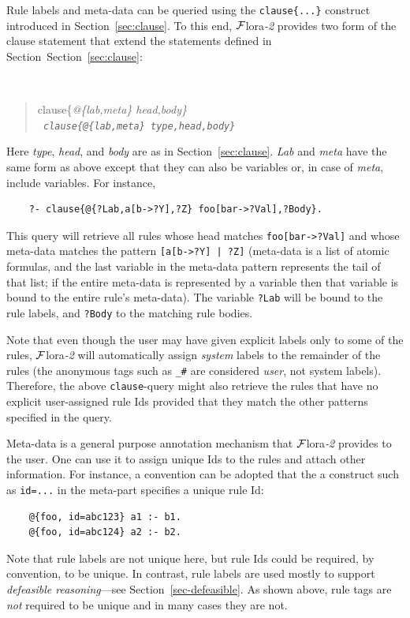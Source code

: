 \documentclass[11pt]{article}
\newcommand{\FLORA}{{\mbox{\sc ${\cal F}${lora}\rm\emph{-2}}}\xspace}
\begin{document}
Rule labels and meta-data can be queried using the {\tt clause\{...\}}
construct introduced in Section~\ref{sec:clause}. To this end, \FLORA
provides two form of the clause statement that extend the statements
defined in Section~Section~\ref{sec:clause}:
{\tt
\begin{quote}
clause\{\it{@\{lab,meta\} head,body}\}\\
\tt
clause\{\it{@\{lab,meta\} type,head,body}\}
\end{quote}
}
Here \emph{type}, \emph{head}, and \emph{body} are as in
Section~\ref{sec:clause}. \emph{Lab} and \emph{meta} have the same form as
above except that they can also be variables or, in case of \emph{meta},
include variables. For instance,
\begin{verbatim}
    ?- clause{@{?Lab,a[b->?Y],?Z} foo[bar->?Val],?Body}.
\end{verbatim}
This query will retrieve all rules whose head matches {\tt foo[bar->?Val]}
and whose meta-data matches the pattern {\tt [a[b->?Y] | ?Z]} (meta-data is
a list of atomic formulas, and the last variable in the meta-data pattern
represents the tail of that list; if the entire meta-data is represented by
a variable then that variable is bound to the entire rule's meta-data).
The variable {\tt ?Lab} will be bound to the rule labels, and {\tt ?Body}
to the matching rule bodies.

Note that even though the user may have given
explicit labels only to some of the rules, \FLORA will automatically
assign \emph{system} labels to the remainder of the rules (the anonymous
tags such as {\tt \_\#} are considered \emph{user}, not system labels).
Therefore, the above {\tt clause}-query might also retrieve  
the rules that have no explicit user-assigned rule Ids provided that they
match the other patterns specified in the query.

Meta-data is a general purpose annotation mechanism that \FLORA provides to
the user. One can use it to assign unique Ids to the rules and attach other
information. For instance, a convention can be adopted that the a construct
such as {\tt id=...} in the meta-part specifies a unique rule Id:
\begin{verbatim}
    @{foo, id=abc123} a1 :- b1.
    @{foo, id=abc124} a2 :- b2.
\end{verbatim}
Note that rule labels are not unique here, but rule Ids could be required,
by convention, to be unique.
In contrast, rule labels are used mostly to support \emph{defeasible
  reasoning}---see Section~\ref{sec-defeasible}.  As shown above, rule
tags are \emph{not} required to be unique and in many cases they are
not. 
\end{document}
